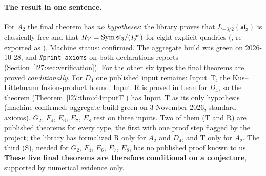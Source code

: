 \paragraph{The result in one sentence.} For $A_2$ the final theorem has \emph{no hypotheses}: the library proves that
$L_{-3/2}(\mathfrak{sl}_3)$ is classically free and that $R_V=\operatorname{Sym}\mathfrak{sl}_3/(I_2^{\mathrm{ns}})$ for eight
explicit quadrics (, re-exported as ). Machine
status: confirmed. The aggregate build was green on 2026-10-28, and \texttt{\#print axioms} on both declarations reports
 (Section~\ref{l27:sec:verification}). For the
other six types the final theorems are proved \emph{conditionally}. For $D_4$ one published input remains: Input~T,
the Kus--Littelmann fusion-product bound. Input~R is proved in Lean for $D_4$, so the theorem
 (Theorem~\ref{l27:thm:d4inputT}) has Input~T as its only hypothesis (machine-confirmed:
aggregate build green on 3 November 2026, standard axioms). $G_2$, $F_4$, $E_6$, $E_7$, $E_8$ rest on three inputs. Two of
them (T and R) are published theorems for every type, the first with one proof step flagged by the project; the library
has formalized R only for $A_2$ and $D_4$, and T only for $A_2$. The third (S), needed for $G_2$, $F_4$, $E_6$, $E_7$,
$E_8$, has no published proof known to us. \textbf{These five final theorems are therefore conditional on a conjecture},
supported by numerical evidence only.

